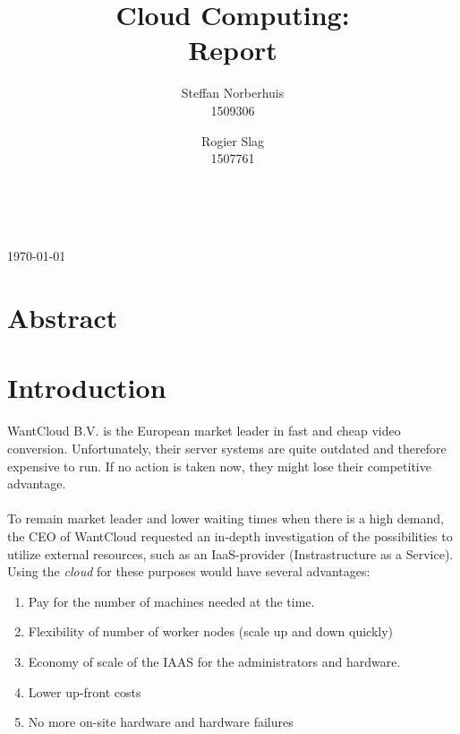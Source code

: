 \documentclass[a4paper]{IEEEtran}
\title{Cloud Computing: \\ Report}
\author{Steffan Norberhuis\\ 1509306 \and
 Rogier Slag\\ 1507761}
\author{
    \IEEEauthorblockN{Steffan Norberhuis, Rogier Slag}\\
    \IEEEauthorblockA{1509306, 1507761}
}
\begin{document}
\maketitle
\begin{center}
\today
\end{center}

\section{Abstract}


\section{Introduction}


WantCloud B.V. is the European market leader in fast and cheap video conversion.
Unfortunately, their server systems are quite outdated and therefore expensive to run.
If no action is taken now, they might lose their competitive advantage.\\
\\
To remain market leader and lower waiting times when there is a high demand, the CEO of WantCloud requested an in-depth investigation of the possibilities to utilize external resources, such as an IaaS-provider (Instrastructure as a Service).
Using the \textit{cloud} for these purposes would have several advantages:

\begin{enumerate}
\item Pay for the number of machines needed at the time.
\item Flexibility of number of worker nodes (scale up and down quickly)
\item Economy of scale of the IAAS for the administrators and hardware.
\item Lower up-front costs
\item No more on-site hardware and hardware failures
\end{enumerate}
\end{document}
